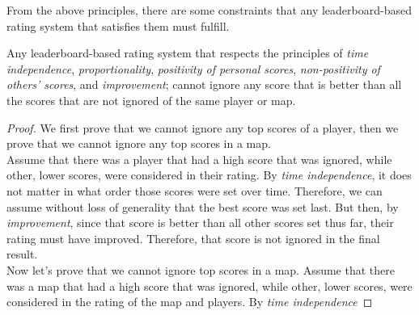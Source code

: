 \documentclass[12pt,a4paper]{article}
\begin{document}
From the above principles, there are some constraints that any leaderboard-based rating system that satisfies them must fulfill.

\begin{theorem}
Any leaderboard-based rating system that respects the principles of {\emph{time independence}}, {\emph{proportionality}}, {\emph{positivity of personal scores}}, {\emph{non-positivity of others' scores}}, and {\emph{improvement}}; cannot ignore any score that is better than all the scores that are not ignored of the same player or map.
\end{theorem}

\begin{proof}
We first prove that we cannot ignore any top scores of a player, then we prove that we cannot ignore any top scores in a map.\\

Assume that there was a player that had a high score that was ignored, while other, lower scores, were considered in their rating. By {\emph{time independence}}, it does not matter in what order those scores were set over time. Therefore, we can assume without loss of generality that the best score was set last. But then, by {\emph{improvement}}, since that score is better than all other scores set thus far, their rating must have improved. Therefore, that score is not ignored in the final result.\\

Now let's prove that we cannot ignore top scores in a map. Assume that there was a map that had a high score that was ignored, while other, lower scores, were considered in the rating of the map and players. By {\emph{time independence}}
\end{proof}
\end{document}
